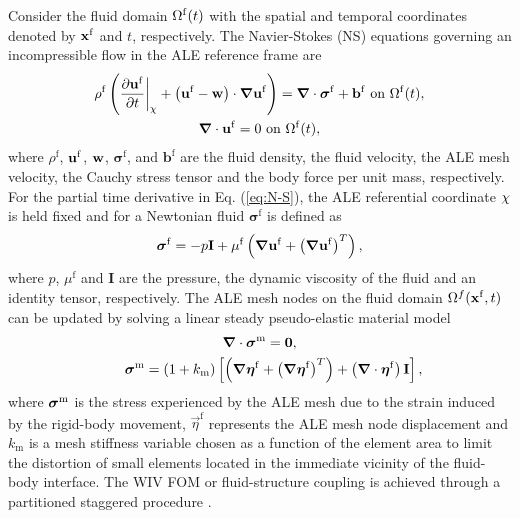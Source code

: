 Consider the fluid domain $\Omega^\mathrm{f}(t)$ with the spatial and temporal coordinates 
denoted by $\mbox{$\mathbf{x}^{\mathrm{f}}$}$ and $t$, respectively.
%
The Navier-Stokes (NS) equations governing an incompressible flow  
in the ALE reference frame are
\begin{gather}
\rho^\mathrm{f} \left( \frac{\partial \mathbf{u}^\mathrm{f}}{\partial t} \bigg\rvert_{\mathbf{\chi}} + \left(\mathbf{u}^\mathrm{f}-\mathbf{w}\right)\cdot \boldsymbol{\nabla} \mathbf{u}^
\mathrm{f} \right ) = \boldsymbol{\nabla} \cdot \boldsymbol{\sigma}^\mathrm{f} + \mathbf{b}^\mathrm{f} \mbox{ on } \Omega^\mathrm{f}(t) \label{eq:N-S}, \\
\boldsymbol{\nabla} \cdot\mathbf{u}^\mathrm{f} = 0 \mbox{ on } \Omega^\mathrm{f}(t) \label{eq:continuity},
\end{gather}
where $\rho^\mathrm{f}$, $\mathbf{u}^\mathrm{f}$, 
$\mathbf{w}$, $\boldsymbol{\sigma}^\mathrm{f}$, and $\mathbf{b}^\mathrm{f}$ 
are the fluid density, the fluid velocity, the ALE mesh velocity, the 
Cauchy stress tensor and the body force per unit mass, respectively. 
%
For the partial time derivative in Eq. (\ref{eq:N-S}), 
the ALE referential coordinate $\mathbf{\chi}$ is held fixed and for a Newtonian fluid
$\boldsymbol{\sigma}^\mathrm{f}$ is defined as
\begin{equation}
\boldsymbol{\sigma}^\mathrm{f} = -p\mathbf{I} + \mu^\mathrm{f}\left(\boldsymbol{\nabla} \mathbf{u}^\mathrm{f} + \left(\boldsymbol{\nabla} \mathbf{u}^\mathrm{f}\right)^T
\right),
\label{eq:cauchyStress}
\end{equation}
%
where $p$, $\mu^\mathrm{f}$ and $ \mathbf{I} $ are the  pressure, the dynamic viscosity of the fluid and an identity tensor, respectively.
The ALE mesh nodes on the fluid domain $\Omega^f(\mbox{$\mathbf{x}^{\mathrm{f}}$},t)$ can be updated by solving a linear steady pseudo-elastic material model
\begin{gather}
\mbox{\boldmath $\nabla$} \cdot {\mbox{\boldmath $\sigma$}}^\mathrm{m} = \mbox{\boldmath $0$}, \\
\qquad {\mbox{\boldmath $\sigma$}}^\mathrm{m} = (1+k_\mathrm{m})\left[\left(\mbox{\boldmath $\nabla$} \mbox{\boldmath $\eta$}^\mathrm{f}+\left(\mbox{\boldmath $\nabla$}
\mbox{\boldmath $\eta$}^\mathrm{f}\right)^T\right)+\left(\mbox{\boldmath $\nabla$} \cdot \mbox{\boldmath $\eta$}^\mathrm{f}\right)\mbox{\boldmath $\mathrm{I}$} \right], 
\label{MeshEq}
\end{gather} 
where ${\mbox{\boldmath $\sigma$}}^\mathrm{m}$ is the stress experienced by the ALE mesh due 
to the strain induced by the rigid-body movement, 
$\vec{\eta}^\mathrm{f}$ represents the ALE mesh node displacement and 
$k_\mathrm{m}$ is a mesh stiffness variable chosen as a function of the element area to 
limit the distortion of small elements located in the immediate vicinity 
of the fluid-body interface.
The WIV FOM or fluid-structure coupling is achieved 
through a partitioned staggered procedure \cite{Jaiman2011,yao_jfm_1}. 
%

